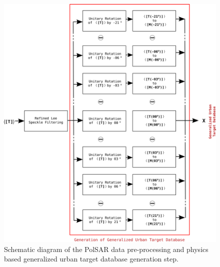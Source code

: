 \begin{figure}[t]
\centering
\includegraphics[width = 0.75\columnwidth]{Figures/Trento/Method1}
\caption[PolSAR data preprocessing]{Schematic diagram of the PolSAR data pre-processing and physics based generalized urban target database generation step.}
\label{fig:method1}
\end{figure}





